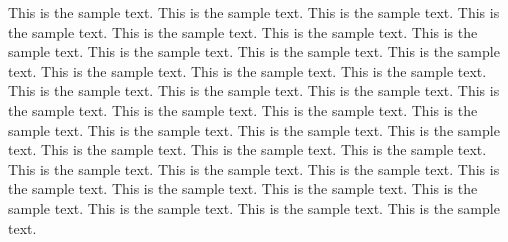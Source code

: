 \documentclass[preprint]{ptephy_v1}%
\begin{document}
This is the sample text. This is the sample text. This is the sample text. This is the sample text.
This is the sample text. This is the sample text. This is the sample text. This is the sample text.
This is the sample text. This is the sample text. This is the sample text. This is the sample text.
This is the sample text. This is the sample text. This is the sample text. This is the sample text.
This is the sample text. This is the sample text. This is the sample text. This is the sample text.
This is the sample text. This is the sample text. This is the sample text. This is the sample text.
This is the sample text. This is the sample text. This is the sample text. This is the sample text.
This is the sample text. This is the sample text. This is the sample text. This is the sample text.
This is the sample text. This is the sample text. This is the sample text. This is the sample text.
\end{document}
